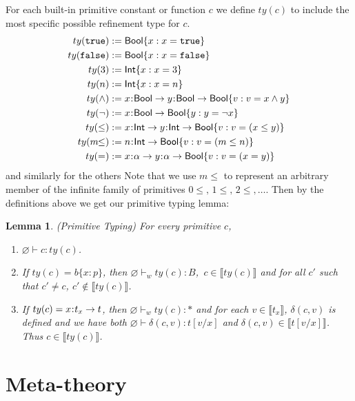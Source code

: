 \documentclass[11pt]{article}
\newtheorem{lemma}[theorem]{Lemma}
\newcommand{\al}{\alpha}
\newcommand{\bind}{\hspace{0.05em}{:}\hspace{0.05em}} %
\newcommand{\col}{\mathbin{:}}       %
\newcommand{\lb}{\llbracket}         %
\newcommand{\rb}{\rrbracket}         %
\newcommand{\true}{\mathtt{true}}
\newcommand{\Int}{{\sf Int}}
\newcommand{\Bool}{{\sf Bool}}
\newcommand{\functype}[3]{#1\bind #2 \rightarrow #3}
\begin{document}
For each built-in primitive constant or function $c$ we define $ty(c)$ to include the most specific possible refinement type for $c$.
\begin{align*}
ty(\true) :=&\; \Bool\{ x : x = \true \}\\
ty({\tt false}) :=&\; \Bool\{ x : x = {\tt false}\}\\
ty(3) :=&\; \Int\{ x : x = 3\} \\
ty(n) :=&\; \Int\{ x : x = n\} \\
ty(\wedge) :=&\; 	x\bind\Bool \rightarrow y\bind\Bool \rightarrow \Bool\{ v : v = x \wedge y\}\\
ty(\neg) :=&\; x\bind\Bool \rightarrow \Bool\{ y : y = \neg x\}\\
ty(\leq) :=&\; x\bind\Int \rightarrow y\bind\Int \rightarrow \Bool\{v : v = (x \leq y)\}\\
ty(m\!\!\leq) :=&\; n\bind\Int \rightarrow \Bool\{v : v = (m \leq n)\}\\
ty(=) :=&\; x\bind\al \rightarrow y\bind\al \rightarrow \Bool\{ v : v = (x = y) \} 
\end{align*}
and similarly for the others %
Note that we use $m\!\!\leq$ to represent an arbitrary member of the infinite family of primitives $0\!\!\leq,\, 1\!\!\leq,\, 2\!\!\leq,\ldots$. Then by the definitions above we get our primitive typing lemma:
\begin{lemma}(Primitive Typing) For every primitive $c$, 
\begin{enumerate}
\item $\varnothing \vdash c : ty(c)$. %
\item If $ty(c) = b\{x \col p\}$, then $\varnothing \vdash_w ty(c) : B$,\, $c \in \lb ty(c) \rb$ and for all $c'$ such that $c' \neq c$, $c' \not\in \lb ty(c)\rb$.
\item If $ty(c) = \functype{x}{t_x}{t}$, then $\varnothing \vdash_w ty(c) : * $ and for each $v \in \lb t_x\rb$, $\delta(c,v)$ is defined and we have both $\varnothing \vdash \delta(c,v) : t[v/x] $ and $\delta(c,v) \in \lb t[v/x] \rb$. Thus $c \in \lb ty(c) \rb$.
\end{enumerate}\label{prim-typing}
\end{lemma}

\section{Meta-theory}  %
\end{document}
